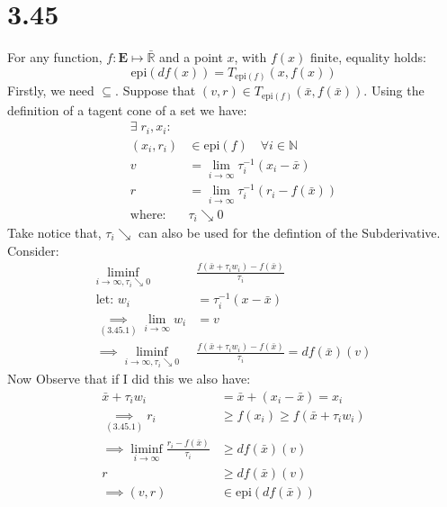 \documentclass[]{article}
\begin{document}
\section*{3.45} 
    For any function, $f: \mathbf{E}\mapsto \bar{\mathbb{R}}$ and a point $x$, with $f(x)$ finite, equality holds: 
    $$
        \text{epi}(df(x)) = T_{\text{epi}(f)}(x, f(x))
    $$
    Firstly, we need $\subseteq$. Suppose that $(v, r) \in T_{\text{epi}(f)}(\bar{x}, f(\bar{x}))$. Using the definition of a tagent cone of a set we have: 
    \begin{align*}\tag{3.45.1}\label{eqn:3.45.1}
        \exists\; r_i, x_i: &
        \\
        (x_i, r_i) &\in \text{epi}(f) \quad \forall i \in \mathbb{N}
        \\
        v &= \lim_{i\rightarrow \infty} \tau_i^{-1}(x_i - \bar{x})
        \\
        r &= \lim_{i\rightarrow \infty} \tau_i^{-1}(r_i - f(\bar{x})) 
        \\
        \text{where: }& \tau_i \searrow 0
    \end{align*}
    Take notice that, $\tau_i \searrow$ can also be used for the defintion of the Subderivative. Consider: 
    \begin{align*}\tag{3.45.2}\label{eqn:3.45.2}
        \liminf_{i\rightarrow \infty, \tau_i \searrow 0 } 
        & \frac{f(\bar{x} + \tau_i w_i) - f(\bar{x})}{ \tau_i}
        \\
        \text{let: } w_i &= \tau_i^{-1}(x - \bar{x}) 
        \\
        \underset{\hyperref[eqn:3.45.1]{(3.45.1)}}{\implies} \lim_{i\rightarrow \infty} w_i &= v 
        \\
        \implies
        \liminf_{i\rightarrow \infty, \tau_i \searrow 0 } 
        & \frac{f(\bar{x} + \tau_i w_i) - f(\bar{x})}{ \tau_i} = df(\bar{x})(v)
    \end{align*}
    Now Observe that if I did this we also have: 
    \begin{align*}\tag{3.45.3}\label{eqn:3.45.3}
        \bar{x} + \tau_iw_i &= \bar{x} + (x_i - \bar{x}) = x_i
        \\
        \underset{\hyperref[eqn:3.45.1]{(3.45.1)}}{\implies} r_i &\ge f(x_i)\ge f(\bar{x} + \tau_i w_i)
        \\
        \implies \liminf_{i\rightarrow \infty} 
        \frac{r_i - f(\bar{x})}{\tau_i} & \ge df(\bar{x})(v)
        \\
        r & \ge df(\bar{x})(v)
        \\
        \implies (v, r) & \in \text{epi}(df(\bar{x}))
    \end{align*}
\end{document}
